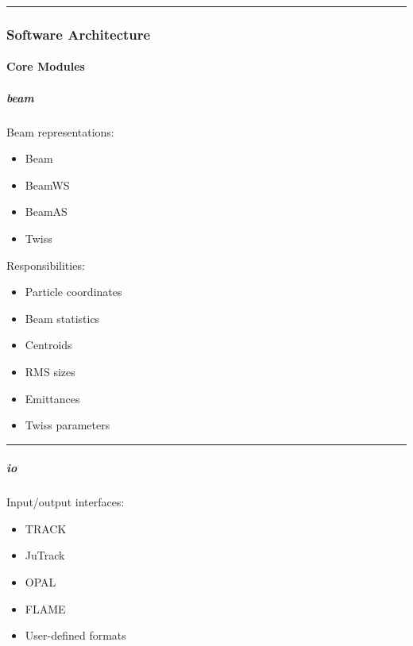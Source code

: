 \documentclass[
]{article}
\providecommand{\tightlist}{%
  \setlength{\itemsep}{0pt}\setlength{\parskip}{0pt}}
\begin{document}
\begin{center}\rule{0.5\linewidth}{0.5pt}\end{center}

\hypertarget{software-architecture}{%
\subsubsection{Software Architecture}\label{software-architecture}}

\hypertarget{core-modules}{%
\paragraph{Core Modules}\label{core-modules}}

\hypertarget{beam}{%
\subparagraph{beam}\label{beam}}

Beam representations:

\begin{itemize}
\tightlist
\item
  Beam
\item
  BeamWS
\item
  BeamAS
\item
  Twiss
\end{itemize}

Responsibilities:

\begin{itemize}
\tightlist
\item
  Particle coordinates
\item
  Beam statistics
\item
  Centroids
\item
  RMS sizes
\item
  Emittances
\item
  Twiss parameters
\end{itemize}

\begin{center}\rule{0.5\linewidth}{0.5pt}\end{center}

\hypertarget{io}{%
\subparagraph{io}\label{io}}

Input/output interfaces:

\begin{itemize}
\tightlist
\item
  TRACK
\item
  JuTrack
\item
  OPAL
\item
  FLAME
\item
  User-defined formats
\end{itemize}
\end{document}
